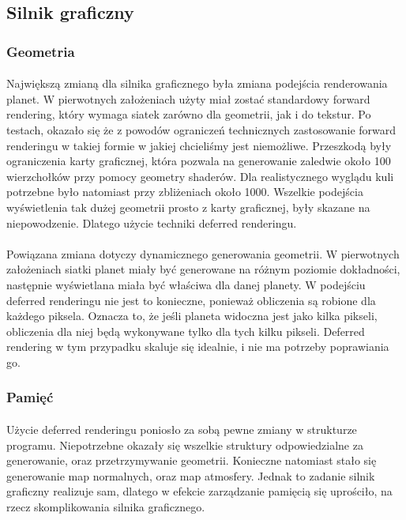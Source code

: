 \subsection{Silnik graficzny}\label{sub:silnik graficzny}
\subsubsection{Geometria}\label{ssub:geometria}
\paragraph{}

Największą zmianą dla silnika graficznego była zmiana podejścia renderowania planet. W pierwotnych założeniach użyty miał zostać standardowy forward rendering, który wymaga siatek zarówno dla geometrii, jak i do tekstur. Po testach, okazało się że z powodów ograniczeń technicznych zastosowanie forward renderingu w takiej formie w jakiej chcieliśmy jest niemożliwe. Przeszkodą były ograniczenia karty graficznej, która pozwala na generowanie zaledwie około 100 wierzchołków przy pomocy geometry shaderów. Dla realistycznego wyglądu kuli potrzebne było natomiast przy zbliżeniach około 1000. Wszelkie podejścia wyświetlenia tak dużej geometrii prosto z karty graficznej, były skazane na niepowodzenie. Dlatego użycie techniki deferred renderingu.
\paragraph{}
Powiązana zmiana dotyczy dynamicznego generowania geometrii. W pierwotnych założeniach siatki planet miały być generowane na różnym poziomie dokładności, następnie wyświetlana miała być właściwa dla danej planety. W podejściu deferred renderingu nie jest to konieczne, ponieważ obliczenia są robione dla każdego piksela. Oznacza to, że jeśli planeta widoczna jest jako kilka pikseli, obliczenia dla niej będą wykonywane tylko dla tych kilku pikseli. Deferred rendering w tym przypadku skaluje się idealnie, i nie ma potrzeby poprawiania go.

\subsubsection{Pamięć}\label{ssub:pamiec}
\paragraph{}

Użycie deferred renderingu poniosło za sobą pewne zmiany w strukturze programu. Niepotrzebne okazały się wszelkie struktury odpowiedzialne za generowanie, oraz przetrzymywanie geometrii. Konieczne natomiast stało się generowanie map normalnych, oraz map atmosfery. Jednak to zadanie silnik graficzny realizuje sam, dlatego w efekcie zarządzanie pamięcią się uprościło, na rzecz skomplikowania silnika graficznego.

